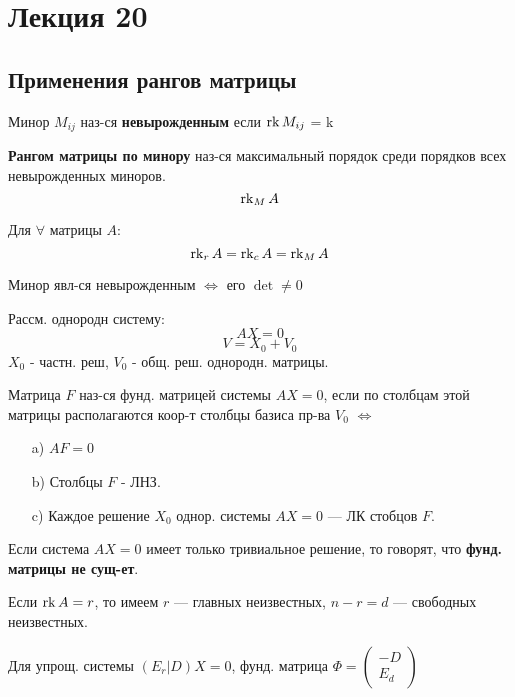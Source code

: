 \section{Лекция 20}
\subsection{Применения рангов матрицы}
\begin{definition}
Минор $M_{ij}$ наз-ся \textbf{невырожденным} если $\operatorname{rk} M_{ij}$ = k
\end{definition}
\begin{definition}
\textbf{Рангом матрицы по минору} наз-ся максимальный порядок среди порядков всех невырожденных миноров.
  \[
  \operatorname{rk}_M A
  \]
\end{definition}
\begin{theorem}[Фробениуса]
Для $\forall$ матрицы $A$:
\[
\operatorname{rk}_r A = \operatorname{rk}_c A = \operatorname{rk}_M A
\]
\end{theorem}
\begin{statement}
Минор явл-ся невырожденным $\iff$ его $\det \neq 0$
\end{statement}
Рассм. однородн систему:
\[
AX = 0
\]
\[
V = X_0 + V_0
\]
$X_0$ - частн. реш, $V_0$ - общ. реш. однородн. матрицы.
\begin{definition}
Матрица $F$ наз-ся фунд. матрицей системы $AX = 0$, если по столбцам этой матрицы располагаются коор-т столбцы базиса пр-ва $V_0$ $\iff$
\begin{itemize}
  \item [a) ] $AF = 0$
  \item [b) ] Столбцы $F$ - ЛНЗ.
  \item [c) ] Каждое решение $X_0$ однор. системы $AX = 0$ --- ЛК стобцов $F$.
\end{itemize}
\end{definition}
\begin{note}
Если система $AX = 0$ имеет только тривиальное решение, то говорят, что \textbf{фунд. матрицы не сущ-ет}.
\end{note}
Если $\operatorname{rk} A = r$, то имеем $r$ --- главных неизвестных, $n - r = d$ --- свободных неизвестных.
\begin{theorem}
Для упрощ. системы $(E_r | D) X = 0$, фунд. матрица $\Phi = \begin{pmatrix}-D \\ E_d \end{pmatrix}$
\end{theorem}
